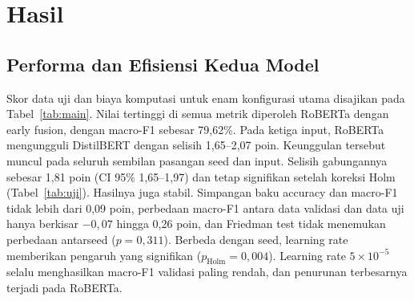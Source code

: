 \documentclass[conference]{IEEEtran}
\begin{document}
\section{Hasil}

\subsection{Performa dan Efisiensi Kedua Model}
Skor data uji dan biaya komputasi untuk enam konfigurasi utama disajikan pada Tabel~\ref{tab:main}. Nilai tertinggi di semua metrik diperoleh RoBERTa dengan early fusion, dengan macro-F1 sebesar 79,62\%. Pada ketiga input, RoBERTa mengungguli DistilBERT dengan selisih 1,65--2,07 poin. Keunggulan tersebut muncul pada seluruh sembilan pasangan seed dan input. Selisih gabungannya sebesar 1,81 poin (CI 95\% 1,65--1,97) dan tetap signifikan setelah koreksi Holm (Tabel~\ref{tab:uji}). Hasilnya juga stabil. Simpangan baku accuracy dan macro-F1 tidak lebih dari 0,09 poin, perbedaan macro-F1 antara data validasi dan data uji hanya berkisar $-0{,}07$ hingga 0,26 poin, dan Friedman test tidak menemukan perbedaan antarseed ($p = 0{,}311$). Berbeda dengan seed, learning rate memberikan pengaruh yang signifikan ($p_{\mathrm{Holm}} = 0{,}004$). Learning rate $5 \times 10^{-5}$ selalu menghasilkan macro-F1 validasi paling rendah, dan penurunan terbesarnya terjadi pada RoBERTa.
\end{document}
